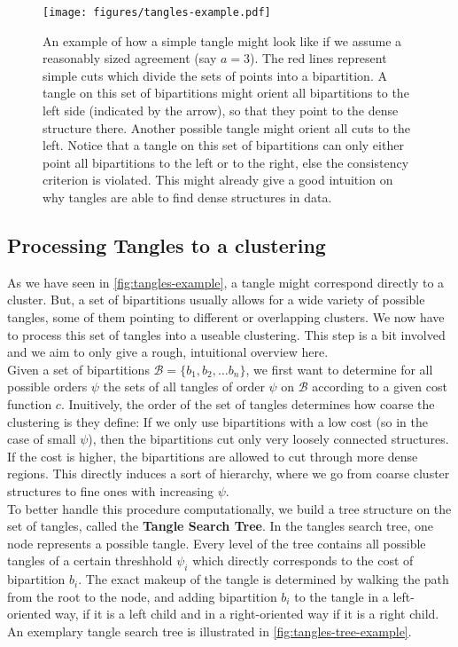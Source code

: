 \begin{figure}[h]
    \centering
    \texttt{[image: figures/tangles-example.pdf]}
    \caption{An example of how a simple tangle might look like if we assume a reasonably sized agreement (say $a = 3$). The red lines represent simple cuts which divide the sets of points into a bipartition.
    A tangle on this set of bipartitions might orient all bipartitions to the left side (indicated by the arrow), so that they point to the dense structure there. Another 
possible tangle might orient all cuts to the left. Notice that a tangle on this set of bipartitions can only either point all bipartitions to the left or to the right, else
the consistency criterion is violated. This might already give a good intuition on why tangles are able to find dense structures in data.}
    \label{fig:tangles-example}
\end{figure}
\FloatBarrier

\subsection{Processing Tangles to a clustering}
As we have seen in \autoref{fig:tangles-example}, a tangle might correspond directly to a cluster. But, a set of bipartitions usually allows for a wide 
variety of possible tangles, some of them pointing to different or overlapping clusters. We now have to process this set of tangles into a useable clustering.
This step is a bit involved and we aim to only give a rough, intuitional overview here. \\

Given a set of bipartitions $\mathcal{B} = \{b_1, b_2, \ldots b_n\} $, we first want to determine for all possible orders $\psi$ the sets of all tangles of order $\psi$ on $\mathcal{B}$ 
according to a given cost function $c$. Inuitively, the order of the set of tangles determines how coarse the clustering is they define:
If we only use bipartitions with a low cost (so in the case of small $\psi$), then the bipartitions cut only very loosely connected structures. 
If the cost is higher, the bipartitions are allowed to cut through more dense regions. This directly induces a sort of hierarchy, where we go from coarse cluster
structures to fine ones with increasing $\psi$. \\
To better handle this procedure computationally, we build a tree structure on the set of tangles, called the \textbf{Tangle Search Tree}. In the tangles search tree, 
one node represents a possible tangle. Every level of the tree contains all possible tangles of a certain threshhold $\psi_i$ which directly corresponds to the cost of bipartition $b_i$. 
The exact makeup of the tangle is determined by walking the path from the root to the node, and adding bipartition $b_i$ to the tangle in a left-oriented way, if it is a left child and
in a right-oriented way if it is a right child. An exemplary tangle search tree is illustrated in \autoref{fig:tangles-tree-example}.

